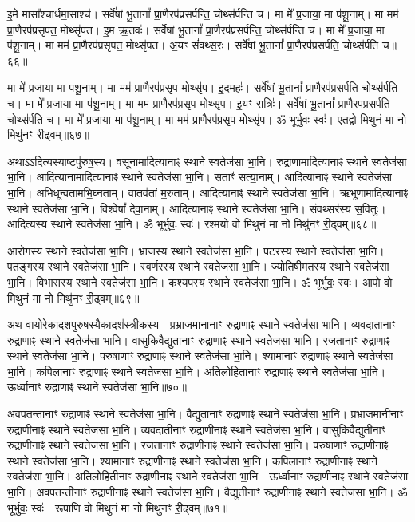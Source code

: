 इ॒मे मासा᳚श्चार्धमा॒साश्च॑। सर्वे॑षां भू॒तानां᳚ प्रा॒णैरप॑प्रसर्पन्ति॒ चोथ्स॑र्पन्ति च। 
मा मे᳚ प्र॒जाया॒ मा प॑शू॒नाम्। मा मम॑ प्रा॒णैरप॑प्रसृपत॒ मोथ्सृ॑पत। 
इ॒म ऋ॒तवः॑। सर्वे॑षां भू॒तानां᳚ प्रा॒णैरप॑प्रसर्पन्ति॒ चोथ्स॑र्पन्ति च। 
मा मे᳚ प्र॒जाया॒ मा प॑शू॒नाम्। मा मम॑ प्रा॒णैरप॑प्रसृपत॒ मोथ्सृ॑पत। 
अ॒यꣳ सं॑वथ्स॒रः। सर्वे॑षां भू॒तानां᳚ प्रा॒णैरप॑प्रसर्पति॒ चोथ्स॑र्पति च॥६६॥\ip


मा मे᳚ प्र॒जाया॒ मा प॑शू॒नाम्। मा मम॑ प्रा॒णैरप॑प्रसृप॒ मोथ्सृ॑प। 
इ॒दमहः॑। सर्वे॑षां भू॒तानां᳚ प्रा॒णैरप॑प्रसर्पति॒ चोथ्स॑र्पति च। 
मा मे᳚ प्र॒जाया॒ मा प॑शू॒नाम्। मा मम॑ प्रा॒णैरप॑प्रसृप॒ मोथ्सृ॑प। 
इ॒यꣳ रात्रिः॑। सर्वे॑षां भू॒तानां᳚ प्रा॒णैरप॑प्रसर्पति॒ चोथ्स॑र्पति च। 
मा मे᳚ प्र॒जाया॒ मा प॑शू॒नाम्। मा मम॑ प्रा॒णैरप॑प्रसृप॒ मोथ्सृ॑प। 
ॐ भूर्भुवः॒ स्वः॑। एतद्वो मिथुनं मा नो मिथु॑नꣳ री॒ढ्वम्॥६७॥\ip\anuvakamend


अथा\-ऽऽदित्यस्याष्टपु॑रुष॒स्य। 
वसूनामादित्यानाꣴ स्थाने स्वतेज॑सा भा॒नि। 
रुद्राणामादित्यानाꣴ स्थाने स्वतेज॑सा भा॒नि। 
आदित्यानामादि\-त्यानाꣴ स्थाने स्वतेज॑सा भा॒नि। 
सताꣳ॑ सत्या॒नाम्। आदित्यानाꣴ स्थाने स्वतेज॑सा भा॒नि। 
अभिधून्वता॑\-मभि॒घ्नताम्। वातव॑तां म॒रुताम्। 
आदित्यानाꣴ स्थाने स्वतेज॑सा भा॒नि। 
ऋभूणामादित्यानाꣴ स्थाने स्वतेज॑सा भा॒नि। 
विश्वेषां᳚ देवा॒नाम्। आदित्यानाꣴ स्थाने स्वतेज॑सा भा॒नि। 
संवथ्सर॑स्य स॒वितुः। आदित्यस्य स्थाने स्वतेज॑सा भा॒नि। 
ॐ भूर्भुवः॒ स्वः॑। रश्मयो वो मिथुनं मा नो मिथु॑नꣳ री॒ढ्वम्॥६८॥\ip\anuvakamend


आरोगस्य स्थाने स्वतेज॑सा भा॒नि। भ्राजस्य स्थाने स्वतेज॑सा भा॒नि। 
पटरस्य स्थाने स्वतेज॑सा भा॒नि। पतङ्गस्य स्थाने स्वतेज॑सा भा॒नि। 
स्वर्णरस्य स्थाने स्वतेज॑सा भा॒नि। ज्योतिषीमतस्य स्थाने स्वतेज॑सा भा॒नि। 
विभासस्य स्थाने स्वतेज॑सा भा॒नि। कश्यपस्य स्थाने स्वतेज॑सा भा॒नि। 
ॐ भूर्भुवः॒ स्वः॑। आपो वो मिथुनं मा नो मिथु॑नꣳ री॒ढ्वम्॥६९॥\ip\anuvakamend


अथ वायोरेकादश\-पुरुषस्यैकादश॑स्त्रीक॒स्य। 
प्रभ्राजमानानाꣳ रुद्राणाꣴ स्थाने स्वतेज॑सा भा॒नि। 
व्यवदातानाꣳ रुद्राणाꣴ स्थाने स्वतेज॑सा भा॒नि। 
वासुकिवैद्युतानाꣳ रुद्राणाꣴ स्थाने स्वतेज॑सा भा॒नि। 
रजतानाꣳ रुद्राणाꣴ स्थाने स्वतेज॑सा भा॒नि। 
परुषाणाꣳ रुद्राणाꣴ स्थाने स्वतेज॑सा भा॒नि। 
श्यामानाꣳ रुद्राणाꣴ स्थाने स्वतेज॑सा भा॒नि। 
कपिलानाꣳ रुद्राणाꣴ स्थाने स्वतेज॑सा भा॒नि। 
अतिलोहितानाꣳ रुद्राणाꣴ स्थाने स्वतेज॑सा भा॒नि। 
ऊर्ध्वानाꣳ रुद्राणाꣴ स्थाने स्वतेज॑सा भा॒नि॥७०॥\ip


अवपतन्तानाꣳ रुद्राणाꣴ स्थाने स्वतेज॑सा भा॒नि। 
वैद्युतानाꣳ रुद्राणाꣴ स्थाने स्वतेज॑सा भा॒नि। 
प्रभ्राजमानीनाꣳ रुद्राणीनाꣴ स्थाने स्वतेज॑सा भा॒नि। 
व्यवदातीनाꣳ रुद्राणीनाꣴ स्थाने स्वतेज॑सा भा॒नि। 
वासुकिवैद्युतीनाꣳ रुद्राणीनाꣴ स्थाने स्वतेज॑सा भा॒नि। 
रजतानाꣳ रुद्राणीनाꣴ स्थाने स्वतेज॑सा भा॒नि। 
परुषाणाꣳ रुद्राणीनाꣴ स्थाने स्वतेज॑सा भा॒नि। 
श्यामानाꣳ रुद्राणीनाꣴ स्थाने स्वतेज॑सा भा॒नि। 
कपिलानाꣳ रुद्राणीनाꣴ स्थाने स्वतेज॑सा भा॒नि। 
अतिलोहितीनाꣳ रुद्राणीनाꣴ स्थाने स्वतेज॑सा भा॒नि। 
ऊर्ध्वानाꣳ रुद्राणीनाꣴ स्थाने स्वतेज॑सा भा॒नि। 
अवपतन्तीनाꣳ रुद्राणीनाꣴ स्थाने स्वतेज॑सा भा॒नि। 
वैद्युतीनाꣳ रुद्राणीनाꣴ स्थाने स्वतेज॑सा भा॒नि। 
ॐ भूर्भुवः॒ स्वः॑। रूपाणि वो मिथुनं मा नो मिथु॑नꣳ री॒ढ्वम्॥७१॥\ip\anuvakamend


